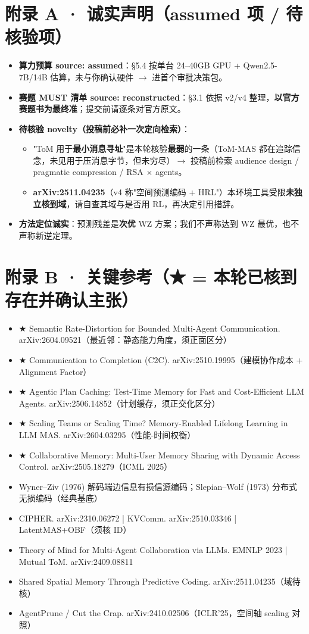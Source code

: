 \documentclass[UTF8,fontset=windows,11pt]{ctexart}
\newcommand{\key}[1]{\textbf{\textcolor{NavyBlue}{#1}}}
\begin{document}
\section*{附录 A · 诚实声明（assumed 项 / 待核验项）}
\begin{itemize}
\item \key{算力预算 source: assumed}：§5.4 按单台 24--40GB GPU + Qwen2.5-7B/14B 估算，未与你确认硬件 $\to$ 进首个审批决策包。
\item \key{赛题 MUST 清单 source: reconstructed}：§3.1 依据 v2/v4 整理，\textbf{以官方赛题书为最终准}；提交前请逐条对官方原文。
\item \key{待核验 novelty（投稿前必补一次定向检索）}：
  \begin{itemize}
  \item "ToM 用于\textbf{最小消息寻址}"是本轮核验\textbf{最弱}的一条（ToM-MAS 都在追踪信念，未见用于压消息字节，但未穷尽）$\to$ 投稿前检索 audience design / pragmatic compression / RSA $\times$ agents。
  \item \textbf{arXiv:2511.04235}（v4 称"空间预测编码 + HRL"）本环境工具受限\textbf{未独立核到域}，请自查其域与是否用 RL，再决定引用措辞。
  \end{itemize}
\item \key{方法定位诚实}：预测残差是\textbf{次优} WZ 方案；我们不声称达到 WZ 最优，也不声称新逆定理。
\end{itemize}

\section*{附录 B · 关键参考（★ = 本轮已核到存在并确认主张）}
\begin{itemize}\small
\item ★ Semantic Rate-Distortion for Bounded Multi-Agent Communication. arXiv:2604.09521（最近邻：静态能力角度，须正面区分）
\item ★ Communication to Completion (C2C). arXiv:2510.19995（建模协作成本 + Alignment Factor）
\item ★ Agentic Plan Caching: Test-Time Memory for Fast and Cost-Efficient LLM Agents. arXiv:2506.14852（计划缓存，须正交化区分）
\item ★ Scaling Teams or Scaling Time? Memory-Enabled Lifelong Learning in LLM MAS. arXiv:2604.03295（性能-时间权衡）
\item ★ Collaborative Memory: Multi-User Memory Sharing with Dynamic Access Control. arXiv:2505.18279（ICML 2025）
\item Wyner--Ziv (1976) 解码端边信息有损信源编码；Slepian--Wolf (1973) 分布式无损编码（经典基底）
\item CIPHER. arXiv:2310.06272 \;|\; KVComm. arXiv:2510.03346 \;|\; LatentMAS+OBF（须核 ID）
\item Theory of Mind for Multi-Agent Collaboration via LLMs. EMNLP 2023 \;|\; Mutual ToM. arXiv:2409.08811
\item Shared Spatial Memory Through Predictive Coding. arXiv:2511.04235（域待核）
\item AgentPrune / Cut the Crap. arXiv:2410.02506（ICLR'25，空间轴 scaling 对照）
\end{itemize}
\end{document}
